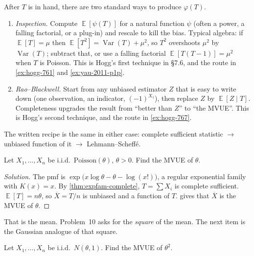 \documentclass[11pt,a4paper]{article}
\DeclareMathOperator{\Var}{Var}
\DeclareMathOperator{\E}{\mathbb{E}}
\begin{document}
\begin{remark}
\label{rem:umvue-recipe}
After \(T\) is in hand, there are two standard ways to produce \(\varphi(T)\).
\begin{enumerate}[label=\textup{(\arabic*)}]
    \item
    \emph{Inspection.} Compute \(\E[\psi(T)]\) for a natural function \(\psi\) (often a power, a falling factorial, or a plug-in) and rescale to kill the bias. Typical algebra: if \(\E[T]=\mu\) then \(\E[T^{2}]=\Var(T)+\mu^{2}\), so \(T^{2}\) overshoots \(\mu^{2}\) by \(\Var(T)\); subtract that, or use a falling factorial \(\E[T(T-1)]=\mu^{2}\) when \(T\) is Poisson. This is Hogg's first technique in \S7.6, and the route in \cref{ex:hogg-761} and \cref{ex:yau-2011-p1p}.
    \item
    \emph{Rao--Blackwell.} Start from any unbiased estimator \(Z\) that is easy to write down (one observation, an indicator, \((-1)^{X_1}\)), then replace \(Z\) by \(\E[Z\mid T]\). Completeness upgrades the result from ``better than \(Z\)'' to ``the MVUE''. This is Hogg's second technique, and the route in \cref{ex:hogg-767}.
\end{enumerate}
The written recipe is the same in either case: complete sufficient statistic \(\to\) unbiased function of it \(\to\) Lehmann--Scheff\'e.
\end{remark}

\begin{exercise}
\label{ex:hogg-753}
Let \(X_1,\dots,X_n\) be i.i.d.\ \(\mathrm{Poisson}(\theta)\), \(\theta>0\). Find the MVUE of \(\theta\).
\end{exercise}

\begin{proof}[Solution]
The pmf is \(\exp\bigl(x\log\theta-\theta-\log(x!)\bigr)\), a regular exponential family with \(K(x)=x\). By \cref{thm:expfam-complete}, \(T=\sum X_i\) is complete sufficient. \(\E[T]=n\theta\), so \(\overline{X}=T/n\) is unbiased and a function of \(T\).  gives that \(\overline{X}\) is the MVUE of \(\theta\).
\end{proof}

That is the mean. Problem~10 asks for the \emph{square} of the mean. The next item is the Gaussian analogue of that square.

\begin{exercise}
\label{ex:hogg-761}
Let \(X_1,\dots,X_n\) be i.i.d.\ \(N(\theta,1)\). Find the MVUE of \(\theta^2\).
\end{exercise}
\end{document}
